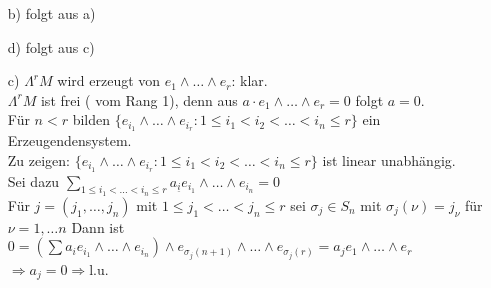  \begin{Bew}
  \begin{enumerate}
   \item[ b) ] folgt aus a)
   \item[ d) ] folgt aus c)
   \item[ c) ] $\Lambda^rM$ wird erzeugt von $e_1 \wedge \dots \wedge e_r$: klar.\\
 $\Lambda^rM$ ist frei ( vom Rang 1), denn aus $a \cdot e_1 \wedge \dots \wedge e_r = 0$ folgt $a=0$. \\
    Für $n<r$ bilden  $\{e_{i_1} \wedge \dots \wedge e_{i_r}: 1 \leq i_1 < i_2 < \dots < i_n \leq r \}$
    ein Erzeugendensystem. \\
    Zu zeigen: $\{e_{i_1} \wedge \dots \wedge e_{i_r}: 1 \leq i_1 < i_2 < \dots < i_n \leq r \}$ ist linear unabh\"angig.\\
 Sei dazu $\sum_{1 \leq i_1 < \dots < i_n \leq r} a_{\underline{i}}e_{i_1} \wedge \dots \wedge e_{i_n} = 0$\\
    F\"ur $j = (j_1, \dots, j_n)$ mit $1 \leq j_1 < \dots < j_n \leq r$ sei $\sigma_j \in S_n$ mit 
    $\sigma_j(\nu) = j_{\nu}$ für $\nu = 1, \dots n$ Dann ist $ 0= (\sum a_i e_{i_1} \wedge \dots \wedge e_{i_n}) \wedge 
    e_{\sigma_j(n+1)}  \wedge \dots \wedge e_{\sigma_j(r) } = a_j e_1 \wedge \dots \wedge e_r$ $\Rightarrow a_j = 0 \Rightarrow $l.u. 
  \end{enumerate}
 \end{Bew}
